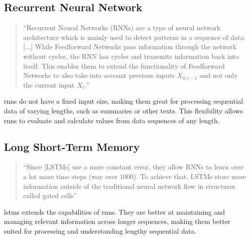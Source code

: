 \subsection{Recurrent Neural Network}
\begin{quote}
``Recurrent Neural Networks (RNNs) are a type of neural network architecture which is mainly used to detect patterns in a sequence of data. [...] 
While Feedforward Networks pass information through the network without cycles, the RNN has cycles and
transmits information back into itself. This enables them to extend the functionality of Feedforward
Networks to also take into account previous inputs $X_{0:t-1}$ and not only the current input $X_{t}.$'' \parencite{DBLP:journals/corr/abs-1912-05911}
\end{quote}
\glspl{rnn} do not have a fixed input size, making them great for processing sequential data of varying lengths, such as summaries or other texts. This flexibility allows \glspl{rnn} to evaluate and calculate values from data sequences of any length.
\subsection{Long Short-Term Memory}
\begin{quote}
``Since [LSTMs] use a more constant error, they allow RNNs to learn over a lot more time
steps (way over 1000). To achieve that, LSTMs store more information outside of the traditional
neural network flow in structures called gated cells'' \parencite{DBLP:journals/corr/abs-1912-05911}
\end{quote}
\glspl{lstm} extends the capabilities of \glspl{rnn}. They are better at maintaining and managing relevant information across longer sequences, making them better suited for processing and understanding lengthy sequential data.